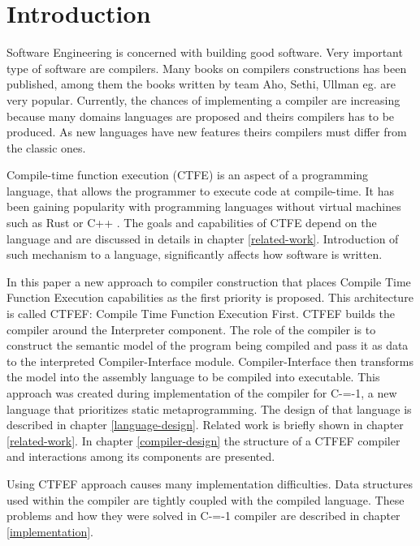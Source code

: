 \section{Introduction}

Software Engineering is concerned with building good software. Very important type of software are compilers. Many books on compilers constructions has been published, among them the books written  by team Aho, Sethi, Ullman eg. \cite{aho2007compilers} are very popular. Currently, the chances of implementing a compiler are increasing because many domains languages are proposed and theirs compilers has to be produced. As new languages have new features theirs compilers must differ from the classic ones.

Compile-time function execution (CTFE) is an aspect of a programming language, that allows the programmer to execute code at compile-time.
It has been gaining popularity with programming languages without virtual machines such as Rust \cite{rust} or C++ \cite{ISO:cpp98}.
The goals and capabilities of CTFE depend on the language and are discussed in details in chapter \ref{related-work}.
Introduction of such mechanism to a language, significantly affects how software is written.

In this paper a new approach to compiler construction that places Compile Time Function Execution capabilities as the first priority is proposed.
This architecture is called CTFEF: Compile Time Function Execution First. CTFEF builds the compiler around the Interpreter component.
The role of the compiler is to construct the semantic model of the program being compiled and pass it as data to the interpreted Compiler-Interface module.
Compiler-Interface then transforms the model into the assembly language to be compiled into executable.
This approach was created during implementation of the compiler for C-=-1, a new language that prioritizes static metaprogramming.
The design of that language is described in chapter \ref{language-design}.
Related work is briefly shown in chapter \ref{related-work}.
In chapter \ref{compiler-design} the structure of a CTFEF compiler and interactions among its components are presented.


Using CTFEF approach causes many implementation difficulties. Data structures used within the compiler are tightly coupled with the compiled language.
These problems and how they were solved in C-=-1 compiler are described in chapter \ref{implementation}.